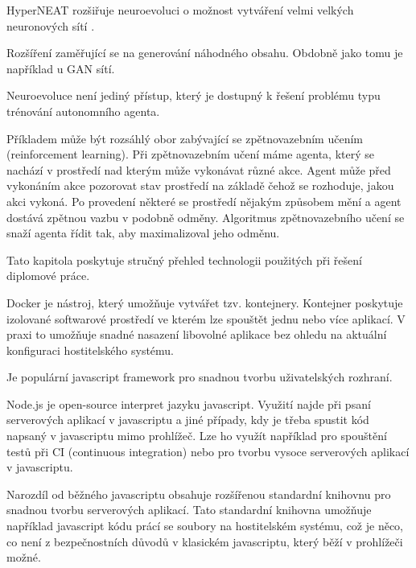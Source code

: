 
HyperNEAT rozšiřuje neuroevoluci o možnost vytváření velmi velkých neuronových sítí \cite[s.~1]{hyperNEAT}.

Rozšíření zaměřující se na generování náhodného obsahu. Obdobně jako tomu je například u GAN sítí.

Neuroevoluce není jediný přístup, který je dostupný k řešení problému typu trénování autonomního agenta.

Příkladem může být rozsáhlý obor zabývající se zpětnovazebním učením (reinforcement learning). Při zpětnovazebním učení máme agenta, který se nachází v prostředí nad kterým může vykonávat různé akce. Agent může před vykonáním akce pozorovat stav prostředí na základě čehož se rozhoduje, jakou akci vykoná. Po provedení některé se prostředí nějakým způsobem mění a agent dostává zpětnou vazbu v podobně odměny. Algoritmus zpětnovazebního učení se snaží agenta řídit tak, aby maximalizoval jeho odměnu. 

Tato kapitola poskytuje stručný přehled technologii použitých při řešení diplomové práce.

Docker je nástroj, který umožňuje vytvářet tzv. kontejnery. Kontejner poskytuje izolované softwarové prostředí ve kterém lze spouštět jednu nebo více aplikací. 
V praxi to umožňuje snadné nasazení libovolné aplikace bez ohledu na aktuální konfiguraci hostitelského systému.

Je populární javascript framework pro snadnou tvorbu uživatelských rozhraní.

Node.js je open-source interpret jazyku javascript. Využití najde při psaní serverových aplikací v javascriptu a jiné případy, kdy je třeba spustit kód napsaný v javascriptu mimo prohlížeč. Lze ho využít například pro spouštění testů při CI (continuous integration) nebo pro tvorbu vysoce serverových aplikací v javascriptu.

Narozdíl od běžného javascriptu obsahuje rozšířenou standardní knihovnu pro snadnou tvorbu serverových aplikací. Tato standardní knihovna umožňuje například javascript kódu prácí se soubory na hostitelském systému, což je něco, co není z bezpečnostních důvodů v klasickém javascriptu, který běží v prohlížeči možné.

